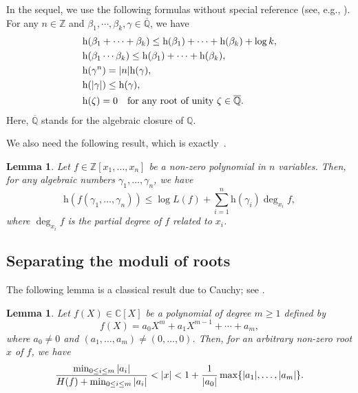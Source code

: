 \documentclass[12pt]{amsart}
\newtheorem{lemma}[theorem]{Lemma}
\theoremstyle{definition}
\theoremstyle{remark}
\numberwithin{equation}{section}
\begin{document}
In the sequel, we  use the following formulas without special reference (see, e.g., \cite{Waldschmidt}). For any $n\in \mathbb{Z}$ and ${\beta}_{1},\cdots,{\beta}_{k},\gamma\in \overline{\mathbb{Q}}$, we have
\begin{align*}
&{\mathrm{h}}({\beta}_{1}+\cdots+{\beta}_{k})\le {\mathrm{h}}({\beta}_{1})+\cdots+{\mathrm{h}}({\beta}_{k})+\log k,\\
&{\mathrm{h}}({\beta}_{1}\cdots {\beta}_{k})\le {\mathrm{h}}({\beta}_{1})+\cdots+{\mathrm{h}}({\beta}_{k}),\\
&{\mathrm{h}}(\gamma^{n})=|n|{\mathrm{h}}(\gamma),\\
&{\mathrm{h}}(|{\gamma}|) \le {\mathrm{h}}({\gamma}), \\
& {\mathrm{h}}(\zeta)=0 \textrm{\quad for any root of unity $\zeta\in \overline{{\mathbb Q}}$}.
\end{align*}
Here, $\overline{{\mathbb Q}}$ stands for the algebraic closure of ${{\mathbb Q}}$.

We also need the following result, which is exactly~\cite[Lemma 3.7]{Waldschmidt}.

\begin{lemma}
\label{antra}
Let $f \in {{\mathbb Z}}[x_1,\ldots,x_n]$ be a non-zero polynomial in $n$ variables.  Then, for any algebraic numbers ${\gamma}_1,\ldots,{\gamma}_n$, we have
$$
{\mathrm{h}}(f({\gamma}_1,\ldots,{\gamma}_n)) \leq \log L(f)+\sum_{i=1}^n {\mathrm{h}}({\gamma}_i) \deg_{x_i} f,
$$
where $\deg_{x_i} f$ is the partial degree of $f$ related to $x_i$.
\end{lemma}

 \subsection{Separating the moduli of roots}

The following lemma is a classical result due to Cauchy; see  \cite[Corollary 8.3.2]{Mishra}.

\begin{lemma}
\label{Cauchy}
Let $f(X) \in {{\mathbb C}}[X]$ be a polynomial of degree $m \ge 1$ defined by
$$
f(X)=a_0X^m+a_1X^{m-1}+\cdots+a_m,
$$
where $a_0\ne 0$ and $(a_1,\dots,a_m)\ne (0,\dots,0)$.
Then, for an arbitrary non-zero root $x$ of $f$, we have
\begin{equation}
\frac{\min_{0\le i \le m}|a_i|}{H(f)+\min_{0\le i \le m}|a_i|}<|x|<1+\frac{1}{|a_0|}\max\{|a_1|,\ldots,|a_{m}|\}.
\notag
\end{equation}
\end{lemma}
\end{document}
